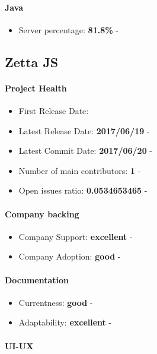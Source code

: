 \documentclass{article}
\begin{document}
\paragraph{Java} 

\begin{itemize}
\item Server percentage: \textbf{81.8\%} - 
\end{itemize}

\subsection{Zetta JS}

\paragraph{Project Health}

\begin{itemize}
\item First Release Date: 
\item Latest Release Date: \textbf{2017/06/19} - 
\item Latest Commit Date: \textbf{2017/06/20} - 
\item Number of main contributors: \textbf{1} - 
\item Open issues ratio: \textbf{0.0534653465} - 
\end{itemize}

\paragraph{Company backing}

\begin{itemize}
\item Company Support: \textbf{excellent} - 
\item Company Adoption: \textbf{good} - 
\end{itemize}

\paragraph{Documentation}

\begin{itemize}
\item Currentness: \textbf{good} - 
\item Adaptability: \textbf{excellent} - 
\end{itemize}

\paragraph{UI-UX}
\end{document}
